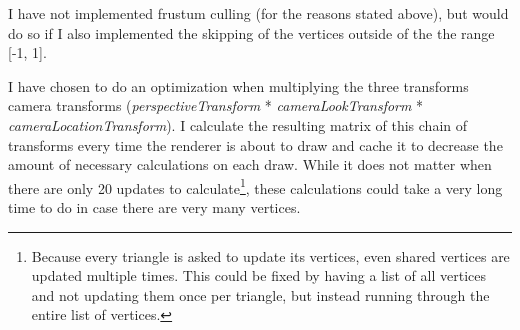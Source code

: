 I have not implemented frustum culling (for the reasons stated above), but would do so if I also implemented the skipping of the vertices outside of the the range [-1, 1].

I have chosen to do an optimization when multiplying the three transforms camera transforms (\textit{perspectiveTransform} * \textit{cameraLookTransform} * \textit{cameraLocationTransform}). I calculate the resulting matrix of this chain of transforms every time the renderer is about to draw and cache it to decrease the amount of necessary calculations on each draw. While it does not matter when there are only 20 updates to calculate\footnote{Because every triangle is asked to update its vertices, even shared vertices are updated multiple times. This could be fixed by having a list of all vertices and not updating them once per triangle, but instead running through the entire list of vertices.}, these calculations could take a very long time to do in case there are very many vertices.